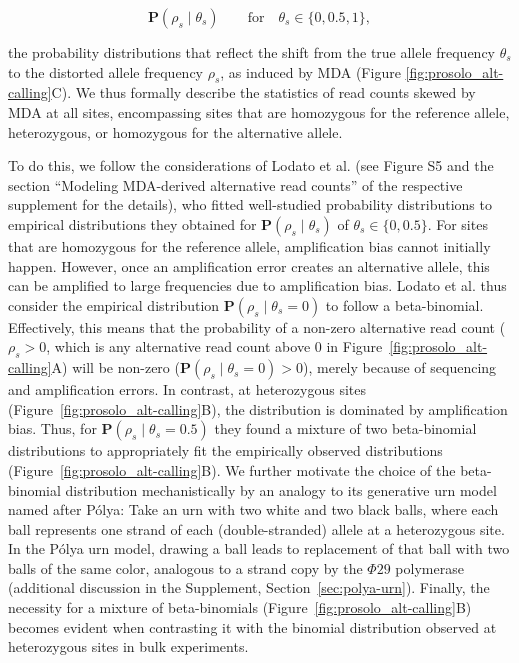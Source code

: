 \documentclass[fleqn,12pt,inline]{wlscirep}
\begin{document}
\begin{equation}
 \mathbf{P}(\rho_s\mid\theta_s)\qquad \text{for}  \quad\theta_s\in\{0,0.5,1\},
\end{equation}

the probability distributions that reflect the shift from the true allele frequency $\theta_s$ to the distorted allele frequency $\rho_s$, as induced by MDA (Figure \ref{fig:prosolo_alt-calling}C).
We thus formally describe the statistics of read counts skewed by MDA at all sites, encompassing sites that are homozygous for the reference allele, heterozygous, or homozygous for the alternative allele.

To do this, we follow the considerations of Lodato et al.\cite{lodato_somatic_2015} (see Figure S5 and the section ``Modeling MDA-derived alternative read counts'' of the respective supplement for the details), who fitted well-studied probability distributions to empirical distributions they obtained for $\mathbf{P}(\rho_s\mid\theta_s)$ of $\theta_s\in\{0,0.5\}$.
For sites that are homozygous for the reference allele, amplification bias cannot initially happen.
However, once an amplification error creates an alternative allele, this can be amplified to large frequencies due to amplification bias.
Lodato et al.\cite{lodato_somatic_2015} thus consider the empirical distribution $\mathbf{P}(\rho_s\mid\theta_s=0)$ to follow a beta-binomial.
Effectively, this means that the probability of a non-zero alternative read count  ($\rho_s>0$, which is any alternative read count above $0$ in Figure~\ref{fig:prosolo_alt-calling}A) will be non-zero ($\mathbf{P}(\rho_s\mid\theta_s=0)>0$), merely because of sequencing and amplification errors.
In contrast, at heterozygous sites (Figure~\ref{fig:prosolo_alt-calling}B), the distribution is dominated by amplification bias.
Thus, for $\mathbf{P}(\rho_s\mid\theta_s=0.5)$ they found a mixture of two beta-binomial distributions to appropriately fit the empirically observed distributions (Figure~\ref{fig:prosolo_alt-calling}B).
We further motivate the choice of the beta-binomial distribution mechanistically by an analogy to its generative urn model named after Pólya\cite{eggenberger_uber_1923}:
Take an urn with two white and two black balls, where each ball represents one strand of each (double-stranded) allele at a heterozygous site.
In the Pólya urn model, drawing a ball leads to replacement of that ball with two balls of the same color, analogous to a strand copy by the $\Phi29$ polymerase (additional discussion in the Supplement, Section~\ref{sec:polya-urn}).
Finally, the necessity for a mixture of beta-binomials (Figure~\ref{fig:prosolo_alt-calling}B) becomes evident when contrasting it with the binomial distribution observed at heterozygous sites in bulk experiments.
\end{document}
